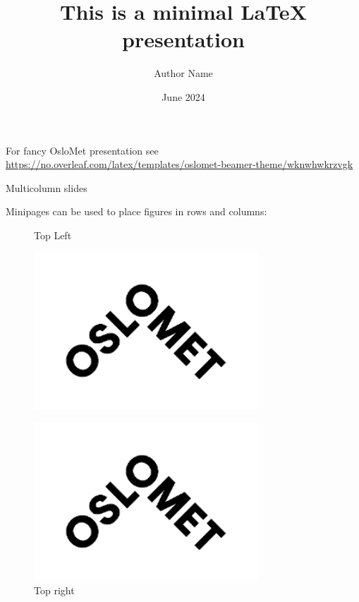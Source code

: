 \documentclass{beamer}
\title{This is a minimal LaTeX presentation}
\author{Author Name}
\date{June 2024}
\begin{document}
\frame{\titlepage}

\begin{frame}{For fancy OsloMet presentation}
    see \href{https://no.overleaf.com/latex/templates/oslomet-beamer-theme/wknwhwkrzvgk}{https://no.overleaf.com/latex/templates/oslomet-beamer-theme/wknwhwkrzvgk}
\end{frame}

\begin{frame}{Multicolumn slides}
    
\end{frame}

\begin{frame}
    Minipages can be used to place figures in rows and columns:
    \begin{figure}[ht]
        \begin{minipage}[t]{0.45\linewidth}
            \centering
            \caption{Top Left}
            \includegraphics[width=0.75\textwidth]{figures/oslomet_logo.png}
            \label{fig:topleft}
        \end{minipage}
        \hspace{0.25cm}
        \begin{minipage}[t]{0.45\linewidth}
            \centering
            \caption{Top right}
            \includegraphics[width=0.75\textwidth]{figures/oslomet_logo.png}

\end{minipage}
\end{figure}
\end{frame}
\end{document}

